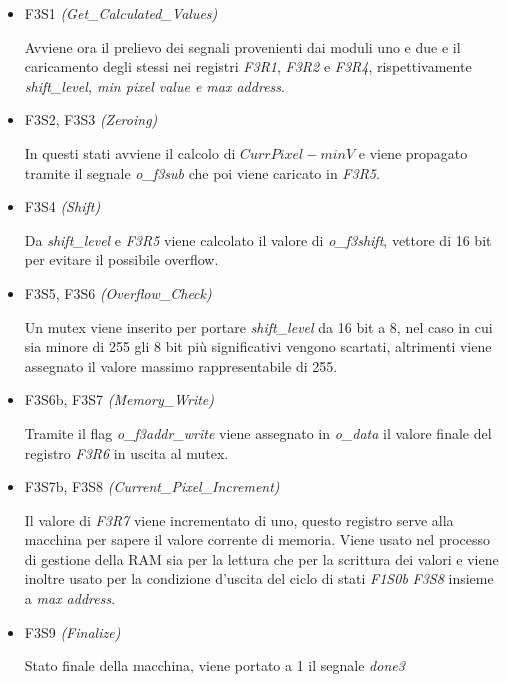 \documentclass{article}
\begin{document}
\begin{enumerate}
\begin{itemize}
		\item F3S1 \emph{(Get\_Calculated\_Values)}
		
		Avviene ora il prelievo dei segnali provenienti dai moduli uno e due e il caricamento degli stessi nei registri \emph{F3R1}, \emph{F3R2} e \emph{F3R4}, rispettivamente \textit{shift\_level, min pixel value \emph{e} max address}.
		
		\item F3S2, F3S3 \emph{(Zeroing)}
		
		In questi stati avviene il calcolo di \(CurrPixel - minV\) e viene propagato tramite il segnale \emph{o\_f3sub} che poi viene caricato in \emph{F3R5}.
		
		\item F3S4 \emph{(Shift)}
		
		Da \emph{shift\_level} e \emph{F3R5} viene calcolato il valore di \emph{o\_f3shift}, vettore di 16 bit per evitare il possibile overflow.
		
		\item F3S5, F3S6 \emph{(Overflow\_Check)}
		
		Un mutex viene inserito per portare \emph{shift\_level} da 16 bit a 8, nel caso in cui sia minore di 255 gli 8 bit più significativi vengono scartati, altrimenti viene assegnato il valore massimo rappresentabile di 255.
		
		\item F3S6b, F3S7 \emph{(Memory\_Write)}
		
		Tramite il flag \emph{o\_f3addr\_write} viene assegnato in \emph{o\_data} il valore finale del registro \emph{F3R6} in uscita al mutex.
		
		\item F3S7b, F3S8 \emph{(Current\_Pixel\_Increment)}
		
		Il valore di \emph{F3R7} viene incrementato di uno, questo registro serve alla macchina per sapere il valore corrente di memoria. Viene usato nel processo di gestione della RAM sia per la lettura che per la scrittura dei valori e viene inoltre usato per la condizione d'uscita del ciclo di stati \emph{F1S0b} \textrightarrow  \emph{F3S8} insieme a \emph{max address}.		
		
		\item F3S9 \emph{(Finalize)}
		
		Stato finale della macchina, viene portato a 1 il segnale \emph{done3}
		
		\end {itemize}
 \end{enumerate}
\end{document}
